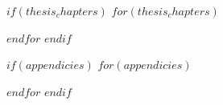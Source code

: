 \documentclass[12pt,a4paper,twoside,openright]{report}
\let\openright=\cleardoublepage
\begin{document}


\tableofcontents

$if(thesis_chapters)$
$for(thesis_chapters)$

$endfor$
$endif$



$if(appendicies)$
\appendix
{}
$for(appendicies)$

$endfor$
$endif$

\openright
\end{document}
